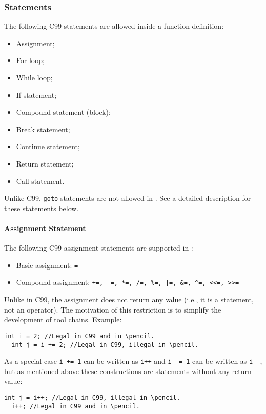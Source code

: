 \subsubsection{Statements}
The following C99 statements are allowed inside a \pencil function definition:
\begin{itemize}
  \item Assignment;
  \item For loop;
  \item While loop;
  \item If statement;
  \item Compound statement (block);
  \item Break statement;
  \item Continue statement;
  \item Return statement;
  \item Call statement.
\end{itemize}
Unlike C99, \lstinline!goto! statements are not allowed in \pencil.
See a detailed description for these statements below.

\paragraph{Assignment Statement}
\label{sec:assignments}
The following C99 assignment statements are supported in \pencil:
\begin{itemize}
  \item Basic assignment: \lstinline!=!
  \item Compound assignment: \lstinline{+=, -=, *=, /=, %=, |=, &=, ^=, <<=, >>=}
\end{itemize}

Unlike in C99, the \pencil assignment does not return any value (i.e.,
it is a statement, not an operator).
The motivation of this restriction is to simplify the development of
\pencil tool chains.
Example:
\begin{lstlisting}[language=pencil]
  int i = 2; //Legal in C99 and in \pencil.
  int j = i += 2; //Legal in C99, illegal in \pencil.
\end{lstlisting}

As a special case \lstinline!i += 1! can be written as \lstinline!i++!
and \lstinline!i -= 1! can be written as \lstinline!i--!, but as mentioned
above these constructions are statements without any return value:

\begin{lstlisting}[language=pencil]
  int j = i++; //Legal in C99, illegal in \pencil.
  i++; //Legal in C99 and in \pencil.
\end{lstlisting}

